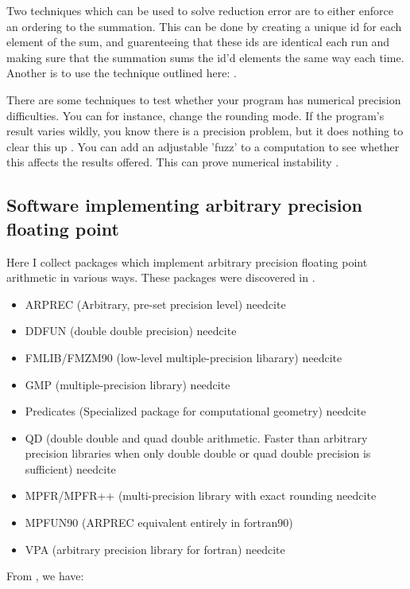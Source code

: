 \documentclass{article}
\newcommand{\needcite}{
	\gls{needcite}
}
\begin{document}
Two techniques which can be used to solve reduction error are to either enforce an ordering to the summation. This can be done by creating a unique id for each element of the sum, and guarenteeing that these ids are identical each run and making sure that the summation sums the id'd elements the same way each time. Another is to use the technique outlined here: \cite{repro-fast-sum}.

There are some techniques to test whether your program has numerical precision difficulties. You can for instance, change the rounding mode. If the program's result varies wildly, you know there is a precision problem, but it does nothing to clear this up \cite{dhb-numerical-bugs}. You can add an adjustable 'fuzz' to a computation to see whether this affects the results offered. This can prove numerical instability \cite{dhb-numerical-bugs}.

\subsection{Software implementing arbitrary precision floating point}

Here I collect packages which implement arbitrary precision floating point arithmetic in various ways. These packages were discovered in \cite{high-precision-arith-in-science}.

\begin{itemize}
\item ARPREC (Arbitrary, pre-set precision level) \needcite
\item DDFUN (double double precision) \needcite
\item FMLIB/FMZM90 (low-level multiple-precision libarary) \needcite
\item GMP (multiple-precision library) \needcite
\item Predicates (Specialized package for computational geometry) \needcite
\item QD (double double and quad double arithmetic. Faster than arbitrary precision libraries when only double double or quad double precision is sufficient) \needcite
\item MPFR/MPFR++ (multi-precision library with exact rounding \needcite
\item MPFUN90 (ARPREC equivalent entirely in fortran90) \cite{mpfun}
\item VPA (arbitrary precision library for fortran) \needcite
\end{itemize}

From \cite{dhb-zurich-hp}, we have:
\end{document}
